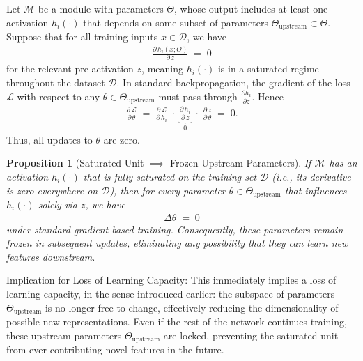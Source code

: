 \documentclass[11pt]{article}
\newtheorem{proposition}{Proposition}[section]
\begin{document}
Let $\mathcal{M}$ be a module with parameters $\Theta$, whose output includes at least one activation $h_i(\cdot)$ that depends on some subset of parameters $\Theta_{\text{upstream}} \subset \Theta$. Suppose that for all training inputs $x\in \mathcal{D}$, we have
\begin{align*}
\frac{\partial \,h_i(x;\Theta)}{\partial \,z} \;=\; 0
\end{align*}
for the relevant pre-activation $z$, meaning $h_i(\cdot)$ is in a saturated regime throughout the dataset $\mathcal{D}$. In standard backpropagation, the gradient of the loss $\mathcal{L}$ with respect to any $\theta \in \Theta_{\text{upstream}}$ must pass through $\frac{\partial h_i}{\partial z}$. Hence
\begin{align*}
\frac{\partial \,\mathcal{L}}{\partial \,\theta}
\;=\;
\frac{\partial \,\mathcal{L}}{\partial \,h_i}
\;\cdot\;
\underbrace{
\frac{\partial \,h_i}{\partial \,z}
}_{0}
\;\cdot\;
\frac{\partial \,z}{\partial \,\theta}
\;=\; 0.
\end{align*}
Thus, all updates to $\theta$ are zero.

\begin{proposition}[Saturated Unit $\implies$ Frozen Upstream Parameters]
\label{prop:SaturatedUnitsFrozenUpstream}
If $\mathcal{M}$ has an activation $h_i(\cdot)$ that is fully saturated on the training set $\mathcal{D}$ (i.e., its derivative is zero everywhere on $\mathcal{D}$), then for every parameter $\theta\in \Theta_{\text{upstream}}$ that influences $h_i(\cdot)$ solely via $z$, we have
\begin{align*}
\Delta \theta \;=\; 0
\end{align*}
under standard gradient-based training. Consequently, these parameters remain frozen in subsequent updates, eliminating any possibility that they can learn new features downstream.
\end{proposition}

Implication for Loss of Learning Capacity: This immediately implies a loss of learning capacity, in the sense introduced earlier: the subspace of parameters $\Theta_{\text{upstream}}$ is no longer free to change, effectively reducing the dimensionality of possible new representations. Even if the rest of the network continues training, these upstream parameters $\Theta_{\text{upstream}}$ are locked, preventing the saturated unit from ever contributing novel features in the future.
\end{document}
